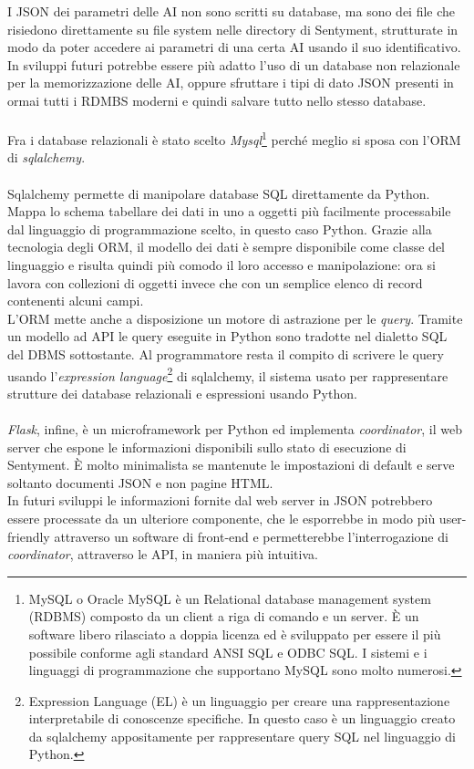 \documentclass[a4paper,12pt]{report}
\begin{document}
I JSON dei parametri delle AI non sono scritti su database, ma sono dei file che risiedono direttamente su file system nelle directory di Sentyment, strutturate in modo da poter accedere ai parametri di una certa AI usando il suo identificativo. In sviluppi futuri potrebbe essere più adatto l'uso di un database non relazionale per la memorizzazione delle AI, oppure sfruttare i tipi di dato JSON presenti in ormai tutti i RDMBS moderni e quindi salvare tutto nello stesso database.\\~\\
Fra i database relazionali è stato scelto \textit{Mysql}\footnote{MySQL o Oracle MySQL è un Relational database management system (RDBMS) composto da un client a riga di comando e un server. È un software libero rilasciato a doppia licenza ed è sviluppato per essere il più possibile conforme agli standard ANSI SQL e ODBC SQL. I sistemi e i linguaggi di programmazione che supportano MySQL sono molto numerosi.} perché meglio si sposa con l'ORM di \textit{sqlalchemy}.\\~\\
Sqlalchemy permette di manipolare database SQL direttamente da Python. Mappa lo schema tabellare dei dati in uno a oggetti più facilmente processabile dal linguaggio di programmazione scelto, in questo caso Python. Grazie alla tecnologia degli ORM, il modello dei dati è sempre disponibile come classe del linguaggio e risulta quindi più comodo il loro accesso e manipolazione: ora si lavora con collezioni di oggetti invece che con un semplice elenco di record contenenti alcuni campi.\\
L'ORM mette anche a disposizione un motore di astrazione per le \textit{query}. Tramite un modello ad API le query eseguite in Python sono tradotte nel dialetto SQL del DBMS sottostante. Al programmatore resta il compito di scrivere le query usando l'\textit{expression language}\footnote{Expression Language (EL) è un linguaggio per creare una rappresentazione interpretabile di conoscenze specifiche. In questo caso è un linguaggio creato da sqlalchemy appositamente per rappresentare query SQL nel linguaggio di Python.} di sqlalchemy, il sistema usato per rappresentare strutture dei database relazionali e espressioni usando Python.\\~\\
\textit{Flask}, infine, è un microframework per Python ed implementa \textit{coordinator}, il web server che espone le informazioni disponibili sullo stato di esecuzione di Sentyment. È molto minimalista se mantenute le impostazioni di default e serve soltanto documenti JSON e non pagine HTML.\\
In futuri sviluppi le informazioni fornite dal web server in JSON potrebbero essere processate da un ulteriore componente, che le esporrebbe in modo più user-friendly attraverso un software di front-end e permetterebbe l'interrogazione di \textit{coordinator}, attraverso le API, in maniera più intuitiva.
\end{document}
